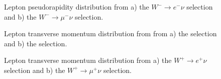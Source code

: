 \begin{figure}[h]
\begin{minipage}[h]{0.49\linewidth}
\end{minipage}
\hfill
\begin{minipage}[h]{0.49\linewidth}
\end{minipage}
\label{ris:WlnuMLep}
\caption{Lepton pseudorapidity distribution from a) the $W^{-} \to e^{-} \nu$ selection and  b) the $W^{-} \to \mu^{-} \nu$ selection.}
\end{figure}


\begin{figure}[h]
\begin{minipage}[h]{0.49\linewidth}
\end{minipage}
\hfill
\begin{minipage}[h]{0.49\linewidth}
\end{minipage}
\label{ris:WlnuLepPt}
\caption{Lepton transverse momentum distribution from from a) the \wenu selection and  b) the \wmunu selection.}
\end{figure}

\begin{figure}[h]
\begin{minipage}[h]{0.49\linewidth}
\end{minipage}
\hfill
\begin{minipage}[h]{0.49\linewidth}
\end{minipage}
\label{ris:WlnuPLepPt}
\caption{Lepton transverse momentum distribution from  a) the $W^{+} \to e^{+} \nu$ selection and  b) the $W^{+} \to \mu^{+} \nu$ selection.}
\end{figure}


